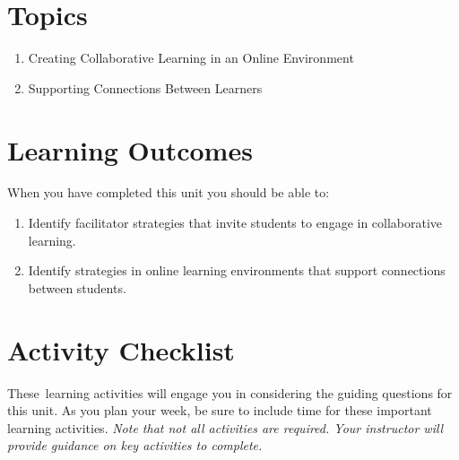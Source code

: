 \documentclass[
]{book}
\providecommand{\tightlist}{%
  \setlength{\itemsep}{0pt}\setlength{\parskip}{0pt}}
\begin{document}
\hypertarget{topics-4}{%
\section*{Topics}\label{topics-4}}

\begin{enumerate}
\def\labelenumi{\arabic{enumi}.}
\tightlist
\item
  Creating Collaborative Learning in an Online Environment
\item
  Supporting Connections Between Learners
\end{enumerate}

\hypertarget{learning-outcomes-4}{%
\section*{Learning Outcomes}\label{learning-outcomes-4}}

When you have completed this unit you should be able to:

\begin{enumerate}
\def\labelenumi{\arabic{enumi}.}
\tightlist
\item
  Identify facilitator strategies that invite students to engage in collaborative learning.
\item
  Identify strategies in online learning environments that support connections between students.
\end{enumerate}

\hypertarget{activity-checklist-4}{%
\section*{Activity Checklist}\label{activity-checklist-4}}

These~learning activities will engage you in considering the guiding questions for this unit. As you plan your week, be sure to include time for these important learning activities. \emph{Note that not all activities are required. Your instructor will provide guidance on key activities to complete.}
\end{document}
